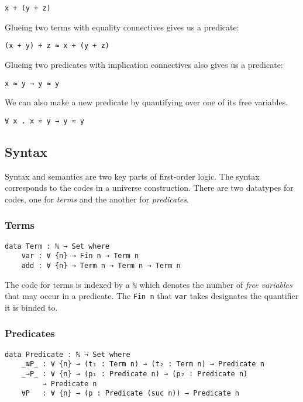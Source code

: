 \documentclass[\main/thesis.tex]{subfiles}
\begin{document}
\begin{lstlisting}
x + (y + z)
\end{lstlisting}

Glueing two terms with equality connectives gives us a predicate:

\begin{lstlisting}
(x + y) + z ≈ x + (y + z)
\end{lstlisting}

Glueing two predicates with implication connectives also gives us a predicate:

\begin{lstlisting}
x ≈ y → y ≈ y
\end{lstlisting}

We can also make a new predicate by quantifying over one of its
free variables.

\begin{lstlisting}
∀ x . x ≈ y → y ≈ y
\end{lstlisting}


\subsection{Syntax}

Syntax and semantics are two key parts of first-order logic.
The syntax corresponds to the codes in a universe construction.
There are two datatypes for codes, one for \textit{terms} and the another for
\textit{predicates}.

\subsubsection{Terms}

\begin{lstlisting}
data Term : ℕ → Set where
    var : ∀ {n} → Fin n → Term n
    add : ∀ {n} → Term n → Term n → Term n
\end{lstlisting}

The code for terms is indexed by a \lstinline|ℕ| which denotes the number
of \textit{free variables} that may occur in a predicate.
The \lstinline|Fin n| that \lstinline|var| takes designates the quantifier it is
binded to.

\subsubsection{Predicates}

\begin{lstlisting}
data Predicate : ℕ → Set where
    _≋P_ : ∀ {n} → (t₁ : Term n) → (t₂ : Term n) → Predicate n
    _→P_ : ∀ {n} → (p₁ : Predicate n) → (p₂ : Predicate n)
         → Predicate n
    ∀P   : ∀ {n} → (p : Predicate (suc n)) → Predicate n
\end{lstlisting}
\end{document}

